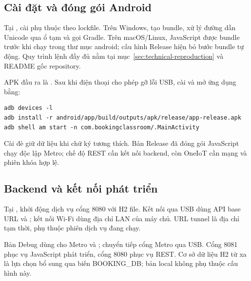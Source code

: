 \subsection{Cài đặt và đóng gói Android}
Tại ,  cài phụ thuộc theo lockfile. Trên Windows,  tạo bundle, xử lý đường dẫn Unicode qua ổ tạm và gọi Gradle. Trên macOS/Linux, JavaScript được bundle trước khi chạy  trong thư mục android; cấu hình Release hiện bỏ bước bundle tự động. Quy trình lệnh đầy đủ nằm tại mục~\ref{sec:technical-reproduction} và README gốc repository.

APK đầu ra là . Sau khi điện thoại cho phép gỡ lỗi USB, cài và mở ứng dụng bằng:
\begin{Verbatim}[fontsize=\small,frame=single,breaklines=true]
adb devices -l
adb install -r android/app/build/outputs/apk/release/app-release.apk
adb shell am start -n com.bookingclassroom/.MainActivity
\end{Verbatim}

Cài đè giữ dữ liệu khi chữ ký tương thích. Bản Release đã đóng gói JavaScript chạy độc lập Metro; chế độ REST cần kết nối backend, còn OneIoT cần mạng và phiên khóa hợp lệ.

\subsection{Backend và kết nối phát triển}
Tại ,  khởi động dịch vụ cổng 8080 với H2 file. Kết nối qua USB dùng API base URL  và ; kết nối Wi-Fi dùng địa chỉ LAN của máy chủ. URL tunnel là địa chỉ tạm thời, phụ thuộc phiên dịch vụ đang chạy.

Bản Debug dùng  cho Metro và ;  chuyển tiếp cổng Metro qua USB. Cổng 8081 phục vụ JavaScript phát triển, cổng 8080 phục vụ REST. Cơ sở dữ liệu H2 từ xa là lựa chọn bổ sung qua biến BOOKING\_DB; bản local không phụ thuộc cấu hình này.
